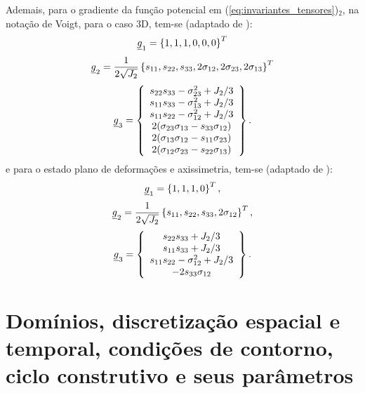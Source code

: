 Ademais, para o gradiente da função potencial em (\ref{eq:invariantes_tensores})$_2$, na notação de Voigt, para o caso 3D, tem-se (adaptado de ):
\begin{equation}
	\label{eq:g1_3D}
	\underline{g}_1 = \left\{1,1,1,0,0,0\right\}^T
\end{equation}
\begin{equation}
	\label{eq:g2_3D}
	\underline{g}_2 = \dfrac{1}{2\sqrt{J_2}} \left\{s_{11},s_{22},s_{33},2\sigma_{12},2\sigma_{23},2\sigma_{13}\right\}^T
\end{equation}
\begin{equation}
	\label{eq:g3_3D}
	\underline{g}_3 = \left\{
	\begin{array}{ccc}
	s_{22}s_{33}-\sigma_{23}^2 + J_2/3 \\
	s_{11}s_{33}-\sigma_{13}^2 + J_2/3 \\	
	s_{11}s_{22}-\sigma_{12}^2 + J_2/3 \\
	2(\sigma_{23}\sigma_{13}-s_{33}\sigma_{12}) \\
	2(\sigma_{13}\sigma_{12}-s_{11}\sigma_{23}) \\
	2(\sigma_{12}\sigma_{23}-s_{22}\sigma_{13})
	\end{array} \right\}.
\end{equation}
e para o estado plano de deformações e axissimetria, tem-se (adaptado de ):
\begin{equation}
	\label{eq:g1_2D}
	\underline{g}_1 = \left\{1,1,1,0\right\}^T,
\end{equation}
\begin{equation}
	\label{eq:g2_2D}
	\underline{g}_2 = \dfrac{1}{2\sqrt{J_2}} \left\{s_{11},s_{22},s_{33},2\sigma_{12}\right\}^T,
\end{equation}
\begin{equation}
	\label{eq:g3_2D}
	\underline{g}_3 = \left\{
	\begin{array}{ccc}
		s_{22}s_{33} + J_2/3 \\
		s_{11}s_{33} + J_2/3 \\	
		s_{11}s_{22}-\sigma_{12}^2 + J_2/3 \\
		- 2s_{33}\sigma_{12}
	\end{array} \right\}.
\end{equation}

\section{Domínios, discretização espacial e temporal, condições de contorno, ciclo construtivo e seus parâmetros}

